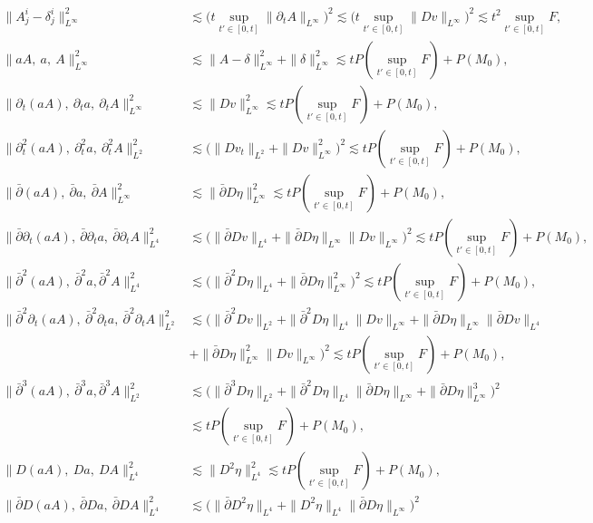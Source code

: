 \documentclass[12pt,a4paper]{amsart}
\numberwithin{equation}{section}
\theoremstyle{plain}
\theoremstyle{definition}
\newcommand{\bpartial}{\bar{\partial}}
\begin{document}
\begin{align*}
\| A^i_j-\delta^i_j\|_{L^{\infty}}^2
&\lesssim  \Big(t\sup\limits_{t'\in[0,t]}\|\partial_t A\|_{L^{\infty}}\Big)^2
\lesssim \Big(t\sup\limits_{t'\in[0,t]}\|D v\|_{L^{\infty}}\Big)^2
\lesssim t^2 \sup\limits_{t'\in[0,t]}F,\\
\| aA,\  a,\  A\|_{L^{\infty}}^2
&\lesssim \|A-\delta\|_{L^{\infty}}^2+\|\delta\|_{L^{\infty}}^2
\lesssim t P(\sup\limits_{t'\in[0,t]}F)+P(M_0),\\
\|\partial_t (aA),\ \partial_t a,\ \partial_t A\|_{L^{\infty}}^2
&\lesssim \|Dv\|_{L^{\infty}} ^2
\lesssim t P(\sup\limits_{t'\in[0,t]}F)+P(M_0),\\
\|\partial_t^2(aA),\ \partial_t^2 a,\ \partial_t^2 A\|_{L^2}^2
&\lesssim \Big( \|Dv_t\|_{L^2}+\|Dv\|_{L^{\infty}}^2 \Big)^2
\lesssim t P(\sup\limits_{t'\in[0,t]}F)+P(M_0),\\
\|\bpartial (aA),\ \bpartial a,\ \bpartial A\|_{L^{\infty}}^2
&\lesssim \|\bpartial D \eta\|_{L^\infty} ^2
\lesssim t P(\sup\limits_{t'\in[0,t]}F)+P(M_0),\\
\|\bpartial\partial_t(aA),\ \bpartial \partial_t a,\ \bpartial \partial_t A\|_{L^4}^2
&\lesssim \Big(\|\bpartial Dv\|_{L^4}+\|\bpartial D\eta\|_{L^{\infty}}\|Dv\|_{L^{\infty}}   \Big)^2
\lesssim t P(\sup\limits_{t'\in[0,t]}F)+P(M_0),\\
\|\bpartial^2 (aA),\ \bpartial^2 a, \bpartial^2 A\|_{L^4}^2
&\lesssim \Big(\|\bpartial^2 D\eta\|_{L^4}+\|\bpartial D\eta\|_{L^{\infty}}^2\Big)^2
\lesssim t P(\sup\limits_{t'\in[0,t]}F)+P(M_0),\\
\|\bpartial^2 \partial_t (aA),\ \bpartial^2 \partial_t a,\ \bpartial^2 \partial_t A\|_{L^2}^2
&\lesssim \Big(\|\bpartial^2 Dv\|_{L^2}+\|\bpartial ^2 D\eta\|_{L^4}\|Dv\|_{L^{\infty}}+\|\bpartial D\eta\|_{L^{\infty}}\|\bpartial Dv\|_{L^4}\\
&+\|\bpartial D\eta\|_{L^{\infty}}^2\|Dv\|_{L^{\infty}}\Big)^2
\lesssim t P(\sup\limits_{t'\in[0,t]}F)+P(M_0),\\
\|\bpartial^3 (aA),\ \bpartial^3 a, \bpartial^3 A\|_{L^2}^2
&\lesssim \Big(\|\bpartial^3 D\eta\|_{L^2}+\|\bpartial^2 D\eta\|_{L^4}\|\bpartial D\eta\|_{L^{\infty}}+\|\bpartial D\eta\|_{L^{\infty}}^3\Big)^2\\
&\lesssim t P(\sup\limits_{t'\in[0,t]}F)+P(M_0),\\
\|D(aA),\ Da,\ DA\|_{L^4}^2
&\lesssim \| D^2\eta\|_{L^4}^2\lesssim t P(\sup\limits_{t'\in[0,t]}F)+P(M_0),\\
\|\bpartial D (aA),\ \bpartial D a,\ \bpartial D A\|_{L^4}^2
&\lesssim \Big( \|\bpartial D^2 \eta\|_{L^4}+\|D^2 \eta\|_{L^4}\|\bpartial D\eta\|_{L^{\infty}} \Big)^2

\end{align*}
\end{document}
